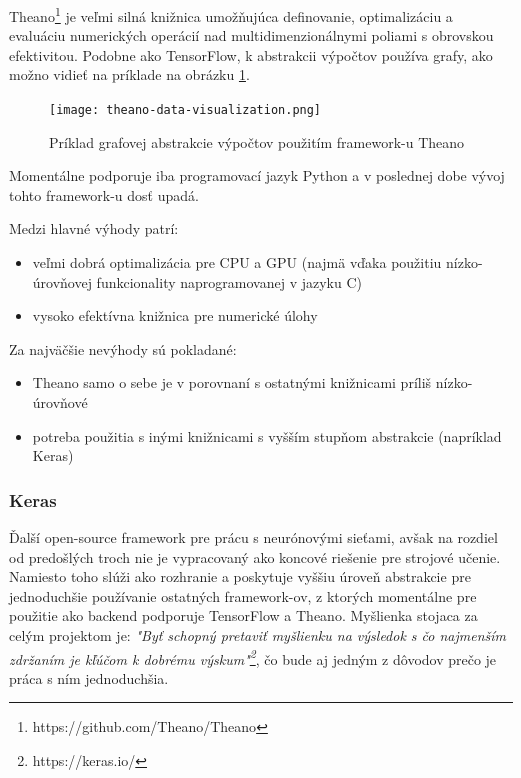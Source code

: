 Theano\footnote{https://github.com/Theano/Theano} je veľmi silná knižnica umožňujúca definovanie, optimalizáciu a evaluáciu numerických operácií nad multidimenzionálnymi poliami s obrovskou efektivitou. Podobne ako TensorFlow, k abstrakcii výpočtov používa grafy, ako možno vidieť na príklade na obrázku \ref{theano_image}.


\begin{figure}[H]
	\begin{center}\texttt{[image: theano-data-visualization.png]}
		\caption[Príklad grafovej abstrakcie výpočtov použitím framework-u Theano]{
			Príklad grafovej abstrakcie výpočtov použitím framework-u Theano\footnotemark
		}\label{theano_image}
	\end{center}
\end{figure}

Momentálne podporuje iba programovací jazyk Python a v poslednej dobe vývoj tohto framework-u dosť upadá.

Medzi hlavné výhody patrí:
\begin{itemize}
	\item veľmi dobrá optimalizácia pre CPU a GPU (najmä vďaka použitiu nízko-úrovňovej funkcionality naprogramovanej v jazyku C)
	\item vysoko efektívna knižnica pre numerické úlohy
\end{itemize}

Za najväčšie nevýhody sú pokladané:
\begin{itemize}
	\item Theano samo o sebe je v porovnaní s ostatnými knižnicami príliš nízko-úrovňové
	\item potreba použitia s inými knižnicami s vyšším stupňom abstrakcie (napríklad Keras) 
\end{itemize}

\subsubsection{Keras}\label{keras}

Ďalší open-source framework pre prácu s neurónovými sieťami, avšak na rozdiel od predošlých troch nie je vypracovaný ako koncové riešenie pre strojové učenie. Namiesto toho slúži ako rozhranie a poskytuje vyššiu úroveň abstrakcie pre jednoduchšie používanie ostatných framework-ov, z ktorých momentálne pre použitie ako backend podporuje TensorFlow a Theano. Myšlienka stojaca za celým projektom je: \textit{"Byť schopný pretaviť myšlienku na výsledok s čo najmenším zdržaním je kľúčom k dobrému výskum"\footnote{https://keras.io/}}, čo bude aj jedným z dôvodov prečo je práca s ním jednoduchšia.

